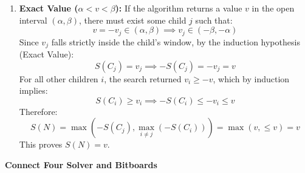 \documentclass[12pt,addpoints]{exam}
\begin{document}
\begin{questions}
\begin{parts}
\begin{solution}
\begin{itemize}
\begin{enumerate}
        \item \textbf{Exact Value ($\alpha < v < \beta$):}
        If the algorithm returns a value $v$ in the open interval $(\alpha, \beta)$, there must exist some child $j$ such that:
        $$v = -v_j \in (\alpha, \beta) \implies v_j \in (-\beta, -\alpha)$$
        Since $v_j$ falls strictly inside the child's window, by the induction hypothesis (Exact Value):
        $$S(C_j) = v_j \implies -S(C_j) = -v_j = v$$
        For all other children $i$, the search returned $v_i \ge -v$, which by induction implies:
        $$S(C_i) \ge v_i \implies -S(C_i) \le -v_i \le v$$
        Therefore:
        $$S(N) = \max( -S(C_j), \max_{i \neq j} (-S(C_i)) ) = \max(v, \le v) = v$$
        This proves $S(N) = v$.
    \end{enumerate}
\end{itemize}
\end{solution}
\end{parts}

\question[15] \textbf{Connect Four Solver and Bitboards}

\end{questions}
\end{document}
